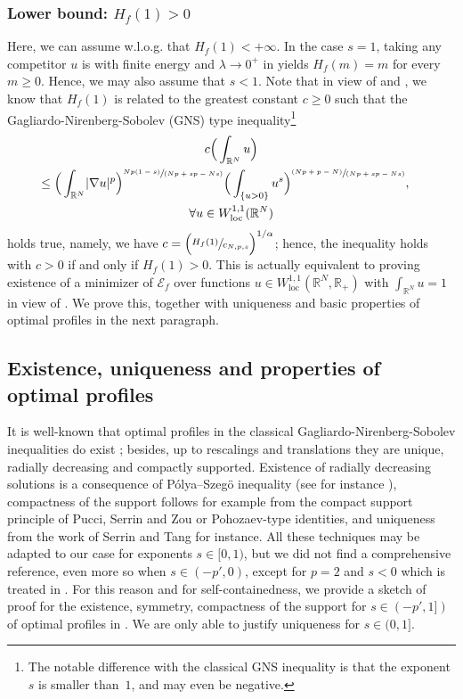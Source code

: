 \documentclass[JEP,XML,SOM,Unicode,published]{cedram}
\newcommand{\spfrac}[2]{{\sfrac{#1}{(#2)}}}
\newcommand{\pspfrac}[2]{{\sfrac{(#1)}{(#2)}}}
\theoremstyle{plain}
\theoremstyle{definition}
\newcommand{\R}{\mathbb{R}}
\newcommand{\ener}{\mathcal{E}}
\newcommand{\loc}{\mathrm{loc}}
\DeclarePairedDelimiter{\abs}{\lvert}{\rvert}
\begin{document}
\subsubsection*{Lower bound: $H_f(1)>0$} Here, we can assume w.l.o.g. that $H_f(1)<+\infty$. In the case $s=1$, taking any competitor $u$ is with finite energy and $\lambda\to 0^+$ in  yields $H_f(m)=m$ for every $m\geq 0$. Hence, we may also assume that $s<1$. Note that in view of  and , we know that $H_f(1)$ is related to the greatest constant $c\geq 0$ such that the Gagliardo-Nirenberg-Sobolev (GNS) type inequality\footnote{The notable difference with the classical GNS inequality is that the exponent $s$ is smaller than~$1$, and may even be negative.}
\begin{multline}\label{GNS_type_inequality}
c\Big(\int_{\R^N}u\Big)\\
\shoveright{\leq\Big(\int_{\R^N}\abs{\nabla u}^p\Big)^{\spfrac{Np(1-s)}{Np+sp-Ns}}\Big(\int_{\{u>0\}}u^s\Big)^{\pspfrac{Np+p-N}{Np+sp-Ns}},}\\
\forall u\in W^{1,1}_{\loc}(\R^N)
\end{multline}
holds true, namely, we have $c=\Big(\sfrac{H_f(1)}{c_{N,p,s}}\Big)^{1/\alpha}$; hence, the inequality  holds with $c>0$ if and only if $H_f(1)>0$. This is actually equivalent to proving existence of a minimizer of $\ener_f$ over functions $u\in W^{1,1}_{\loc}(\R^N,\R_+)$ with $\int_{\R^N}u=1$ in view of . We prove this, together with uniqueness and basic properties of optimal profiles in the next paragraph.

\subsection*{Existence, uniqueness and properties of optimal profiles} It is well-known that optimal profiles in the classical Gagliardo-Nirenberg-Sobolev inequalities do exist ; besides, up to rescalings and translations they are unique, radially decreasing and compactly supported. Existence of radially decreasing solutions is a consequence of Pólya–Szegö inequality (see for instance \cite{brothersMinimalRearrangementsSobolev1988}), compactness of the support follows for example from the compact support principle of Pucci, Serrin and Zou \cite{pucciStrongMaximumPrinciple1999} or Pohozaev-type identities, and uniqueness from the work of Serrin and Tang \cite{serrinUniquenessGroundStates2000} for instance. All these techniques may be adapted to our case for exponents $s\in [0,1)$, but we did not find a comprehensive reference, even more so when $s \in (-p',0)$, except for $p=2$ and $s<0$ which is treated in \cite{dubsProblemesPerturbationsSingulieres1998}. For this reason and for self-containedness, we provide a sketch of proof for the existence, symmetry, compactness of the support for $s\in (-p',1])$ of optimal profiles in . We are only able to justify uniqueness for $s\in (0,1]$.
\end{document}
